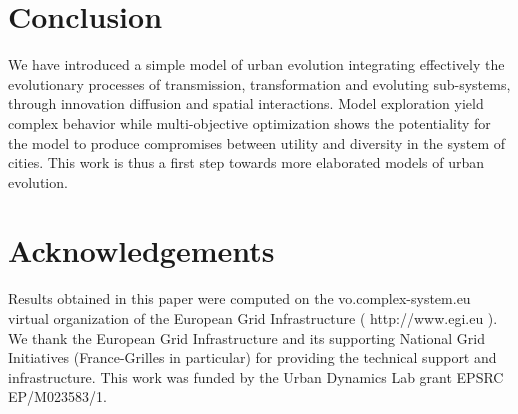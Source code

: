 \documentclass[letterpaper]{article}
\begin{document}
\section{Conclusion}

We have introduced a simple model of urban evolution integrating effectively the evolutionary processes of transmission, transformation and evoluting sub-systems, through innovation diffusion and spatial interactions. Model exploration yield complex behavior while multi-objective optimization shows the potentiality for the model to produce compromises between utility and diversity in the system of cities. This work is thus a first step towards more elaborated models of urban evolution.


\bigskip

\section{Acknowledgements}

Results obtained in this paper were computed on the vo.complex-system.eu virtual organization of the European Grid Infrastructure ( http://www.egi.eu ). We thank the European Grid Infrastructure and its supporting National Grid Initiatives (France-Grilles in particular) for providing the technical support and infrastructure. This work was funded by the Urban Dynamics Lab grant EPSRC EP/M023583/1.

\bigskip

\footnotesize

\end{document}
